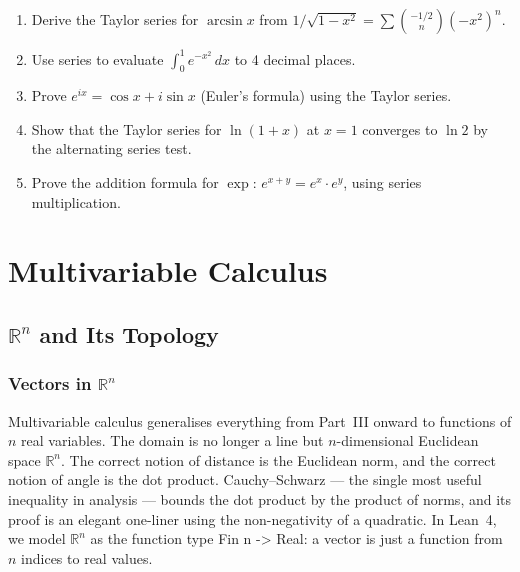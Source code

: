 \documentclass[12pt, openany]{book}
\theoremstyle{plain}
\theoremstyle{definition}
\theoremstyle{remark}
\newcommand{\R}{\mathbb{R}}
\newcommand{\li}[1]{{\ttfamily\small\color{tealaccent}#1}}
\begin{document}
\begin{exbox}
\begin{enumerate}
  \item Derive the Taylor series for $\arcsin x$ from $1/\sqrt{1-x^2} = \sum \binom{-1/2}{n}(-x^2)^n$.
  \item Use series to evaluate $\int_0^1 e^{-x^2}\,dx$ to 4 decimal places.
  \item Prove $e^{ix} = \cos x + i\sin x$ (Euler's formula) using the Taylor series.
  \item Show that the Taylor series for $\ln(1+x)$ at $x = 1$ converges to $\ln 2$ by the alternating series test.
  \item Prove the addition formula for $\exp$: $e^{x+y} = e^x \cdot e^y$, using series multiplication.
\end{enumerate}
\end{exbox}
\color{black}

\part{Multivariable Calculus}
\color{black}

\chapter{\texorpdfstring{$\R^n$}{Rn} and Its Topology}
\color{black}

\section{Vectors in \texorpdfstring{$\R^n$}{Rn}}

Multivariable calculus generalises everything from Part~III onward to functions of $n$ real variables.  The domain is no longer a line but $n$-dimensional Euclidean space $\R^n$.  The correct notion of distance is the Euclidean norm, and the correct notion of angle is the dot product.  Cauchy--Schwarz --- the single most useful inequality in analysis --- bounds the dot product by the product of norms, and its proof is an elegant one-liner using the non-negativity of a quadratic.  In Lean~4, we model $\R^n$ as the function type \li{Fin n -> Real}: a vector is just a function from $n$ indices to real values.
\end{document}

